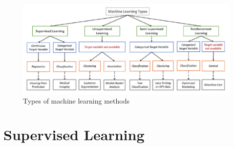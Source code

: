\begin{figure}[H]
    \begin{center}
        \includegraphics[width=\textwidth]{chapters/3_images/type_of_ml_methods.png}
    \end{center}
    \caption{Types of machine learning methods}
    \label{fig:type_of_ml_methods}
\end{figure}
\chapter{Supervised Learning}

